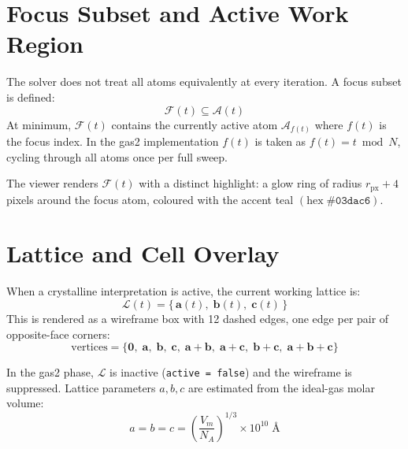 ﻿\documentclass[11pt]{article}
\begin{document}
\section{Focus Subset and Active Work Region}

The solver does not treat all atoms equivalently at every iteration.
A focus subset is defined:
\begin{equation}
  \mathcal{F}(t) \subseteq \mathcal{A}(t)
\end{equation}
At minimum, $\mathcal{F}(t)$ contains the currently active atom
$\mathcal{A}_{f(t)}$ where $f(t)$ is the focus index.
In the gas2 implementation $f(t)$ is taken as
$f(t) = t \bmod N$, cycling through all atoms once per full sweep.

The viewer renders $\mathcal{F}(t)$ with a distinct highlight:
a glow ring of radius $r_\mathrm{px} + 4$ pixels around the focus atom,
coloured with the accent teal $(\mathrm{hex}\;\texttt{\#03dac6})$.

\section{Lattice and Cell Overlay}
\label{sec:lattice}

When a crystalline interpretation is active, the current working lattice is:
\begin{equation}
  \mathcal{L}(t) = \bigl\{\,\mathbf{a}(t),\;\mathbf{b}(t),\;\mathbf{c}(t)\,\bigr\}
\end{equation}
This is rendered as a wireframe box with 12 dashed edges,
one edge per pair of opposite-face corners:
\begin{equation}
  \text{vertices} = \bigl\{
    \mathbf{0},\;\mathbf{a},\;\mathbf{b},\;\mathbf{c},\;
    \mathbf{a}+\mathbf{b},\;\mathbf{a}+\mathbf{c},\;\mathbf{b}+\mathbf{c},\;
    \mathbf{a}+\mathbf{b}+\mathbf{c}
  \bigr\}
\end{equation}

In the gas2 phase, $\mathcal{L}$ is inactive (\texttt{active = false})
and the wireframe is suppressed.
Lattice parameters $a, b, c$ are estimated from the ideal-gas molar volume:
\begin{equation}
  a = b = c = \left(\frac{V_m}{N_A}\right)^{1/3} \times 10^{10}\;\text{\AA}
\end{equation}
\end{document}

